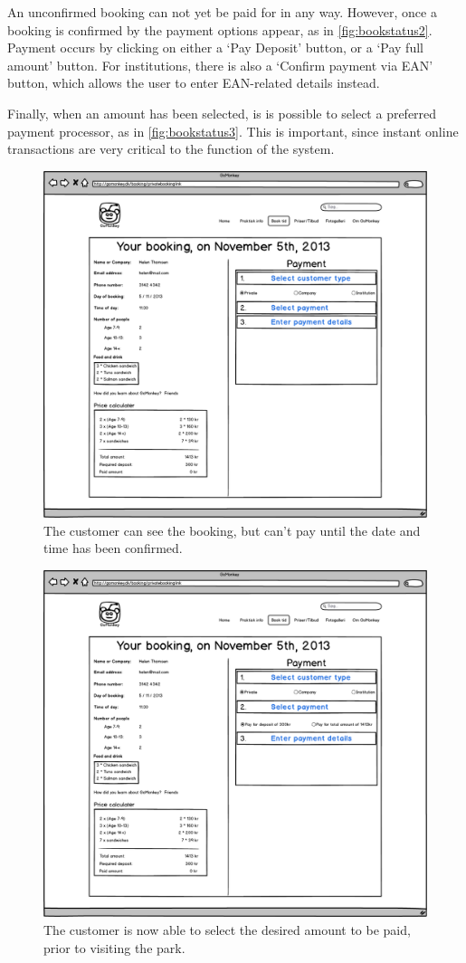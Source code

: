 An unconfirmed booking can not yet be paid for in any way. However, once a 
booking is confirmed by \gomonkey{} the payment options appear, as in 
\autoref{fig:bookstatus2}. Payment occurs 
by clicking on either a ‘Pay Deposit’ button, or a ‘Pay full amount’ button. 
For institutions, there is also a ‘Confirm payment via EAN’ button, which 
allows the user to enter EAN-related details instead.

Finally, when an amount has been selected, is is possible to select a preferred
payment processor, as in \autoref{fig:bookstatus3}. This is important, since 
instant online transactions are very
critical to the function of the system.

\begin{figure}[htbp]
    \centering
        \includegraphics[width=.8\textwidth]{figures/mockup/booking_payment_1.png}
	    \caption{The customer can see the booking, but can't pay until the date and time has been confirmed.}
        \label{fig:bookstatus1}
\end{figure}
\begin{figure}[htbp]
    \centering
        \includegraphics[width=.8\textwidth]{figures/mockup/booking_payment_2.png}
	    \caption{The customer is now able to select the desired amount to be paid, prior to visiting the park.}
        \label{fig:bookstatus2}
\end{figure}
